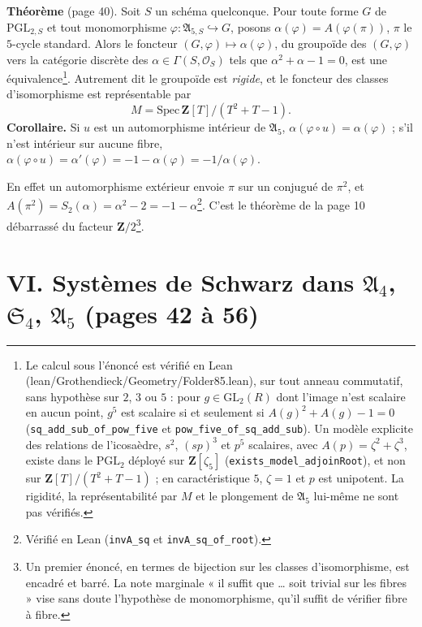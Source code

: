 \documentclass[11pt,a4paper]{article}
\begin{document}
\textbf{Théorème} (page 40). Soit $S$ un schéma quelconque. Pour toute forme
$G$ de $\mathrm{PGL}_{2,S}$ et tout monomorphisme $\varphi :
\mathfrak{A}_{5,S} \hookrightarrow G$, posons $\alpha(\varphi) =
A(\varphi(\pi))$, $\pi$ le $5$-cycle standard. Alors le foncteur $(G, \varphi)
\mapsto \alpha(\varphi)$, du groupoïde des $(G, \varphi)$ vers la catégorie
discrète des $\alpha \in \Gamma(S, \mathcal{O}_S)$ tels que $\alpha^2 + \alpha
- 1 = 0$, est une équivalence\footnote{Le calcul sous l'énoncé est vérifié
en Lean (lean/Grothendieck/Geometry/Folder85.lean), sur tout anneau commutatif, sans
hypothèse sur $2$, $3$ ou $5$ : pour $g \in \mathrm{GL}_2(R)$ dont l'image
n'est scalaire en aucun point, $g^5$ est scalaire si et seulement si $A(g)^2
+ A(g) - 1 = 0$ (\texttt{sq\_add\_sub\_of\_pow\_five} et
\texttt{pow\_five\_of\_sq\_add\_sub}). Un modèle explicite des relations de
l'icosaèdre, $s^2$, $(sp)^3$ et $p^5$ scalaires, avec $A(p) = \zeta^2 +
\zeta^3$, existe dans le $\mathrm{PGL}_2$ déployé sur $\mathbf{Z}[\zeta_5]$
(\texttt{exists\_model\_adjoinRoot}), et non sur $\mathbf{Z}[T]/(T^2 + T -
1)$ ; en caractéristique $5$, $\zeta = 1$ et $p$ est unipotent. La rigidité,
la représentabilité par $M$ et le plongement de $\mathfrak{A}_5$ lui-même ne
sont pas vérifiés.}. Autrement dit le groupoïde est \emph{rigide},
et le foncteur des classes d'isomorphisme est représentable par
\[
  M = \mathrm{Spec}\, \mathbf{Z}[T]/(T^2 + T - 1) .
\]
\textbf{Corollaire.} Si $u$ est un automorphisme intérieur de
$\mathfrak{A}_5$, $\alpha(\varphi \circ u) = \alpha(\varphi)$ ; s'il n'est
intérieur sur aucune fibre, $\alpha(\varphi \circ u) = \alpha'(\varphi) = -1 -
\alpha(\varphi) = -1/\alpha(\varphi)$.

En effet un automorphisme extérieur envoie $\pi$ sur un conjugué de $\pi^2$, et
$A(\pi^2) = S_2(\alpha) = \alpha^2 - 2 = -1 - \alpha$\footnote{Vérifié en Lean
(\texttt{invA\_sq} et \texttt{invA\_sq\_of\_root}).}. C'est le théorème de la
page 10 débarrassé du facteur $\mathbf{Z}/2$\footnote{Un premier énoncé, en
termes de bijection sur les classes d'isomorphisme, est encadré et barré. La
note marginale « il suffit que \ldots{} soit trivial sur les fibres » vise sans
doute l'hypothèse de monomorphisme, qu'il suffit de vérifier fibre à fibre.}.

\section*{VI. Systèmes de Schwarz dans $\mathfrak{A}_4$, $\mathfrak{S}_4$, $\mathfrak{A}_5$ (pages 42 à 56)}
\end{document}
